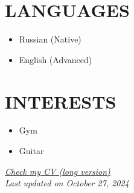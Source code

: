 \documentclass[11pt,a4paper]{moderncv}
\newcommand*{\scoreentry}[3][2.5mm]{
    {\bfseries #2} \\
    {\itshape #3}
    \par\addvspace{#1}
}
\begin{document}
\begin{minipage}[t]{0.35\textwidth}

\section{LANGUAGES}
\begin{itemize}
    \item Russian (Native)
    \item English (Advanced)
\end{itemize}

\section{INTERESTS}
\begin{itemize}
    \item Gym
    \item Guitar
\end{itemize}
\end{minipage}

\vspace*{\fill}
\begin{center}
\textit{\href{https://latexonline.cc/compile?git=https://github.com/kisnikser/CV&target=cv.tex&command=xelatex&force=true}{Check my CV (long version)}}\\
\textit{Last updated on October 27, 2024}
\end{center}
\vspace{-0.5cm}
\end{document}
